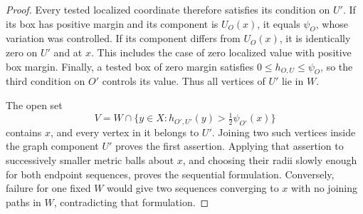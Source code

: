 \begin{proof}
Every tested localized coordinate therefore satisfies its
condition on $U'$.  If its box has positive margin and its
component is $U_O(x)$, it equals $\psi_O$, whose variation was
controlled.  If its component differs from $U_O(x)$, it is identically
zero on $U'$ and at $x$.  This includes the case of zero localized
value with positive box margin.  Finally, a tested box of zero margin
satisfies $0\le h_{O,U}\le\psi_O$, so the third condition on $O'$
controls its value.  Thus all vertices of $U'$ lie in $W$.

The open set
\[
 V=W\cap\{y\in X:
       h_{O',U'}(y)>\tfrac12\psi_{O'}(x)\}
\]
contains $x$, and every vertex in it belongs to $U'$.  Joining two
such vertices inside the graph component $U'$ proves the first
assertion.  Applying that assertion to successively smaller metric
balls about $x$, and choosing their radii slowly enough for both
endpoint sequences, proves the sequential formulation.  Conversely,
failure for one fixed $W$ would give two sequences converging to $x$
with no joining paths in $W$, contradicting that formulation.
\end{proof}
